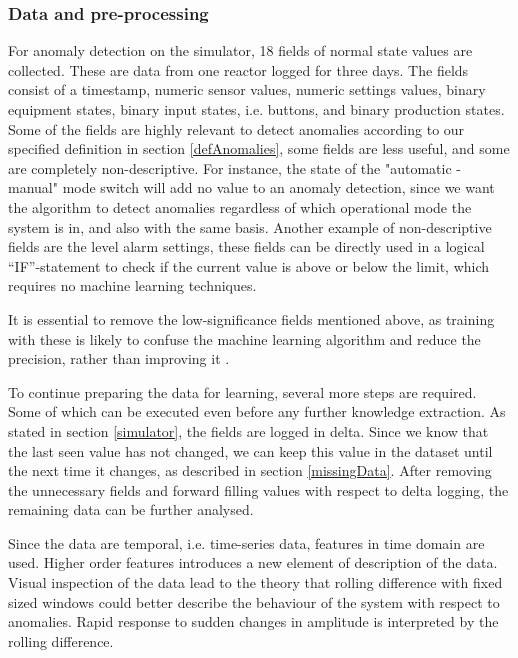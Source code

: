 \documentclass[english, a4paper]{report}
\begin{document}
{{{            \subsubsection{Data and pre-processing} \label{simuAnomDPP}
            {                
                For anomaly detection on the simulator, 18 fields of normal state values are collected. These are data from one reactor logged for three days. The fields consist of a timestamp, numeric sensor values, numeric settings values, binary equipment states, binary input states, i.e. buttons, and binary production states. Some of the fields are highly relevant to detect anomalies according to our specified definition in section \ref{defAnomalies}, some fields are less useful, and some are completely non-descriptive. For instance, the state of the "automatic - manual" mode switch will add no value to an anomaly detection, since we want the algorithm to detect anomalies regardless of which operational mode the system is in, and also with the same basis. Another example of non-descriptive fields are the level alarm settings, these fields can be directly used in a logical “IF”-statement to check if the current value is above or below the limit, which requires no machine learning techniques.
                \par
                It is essential to remove the low-significance fields mentioned above, as training with these is likely to confuse the machine learning algorithm and reduce the precision, rather than improving it \cite{appliedPredictiveModeling}.
                \par
                To continue preparing the data for learning, several more steps are required. Some of which can be executed even before any further knowledge extraction. As stated in section \ref{simulator}, the fields are logged in delta. Since we know that the last seen value has not changed, we can keep this value in the dataset until the next time it changes, as described in section \ref{missingData}. After removing the unnecessary fields and forward filling values with respect to delta logging, the remaining data can be further analysed. 
                \par
                Since the data are temporal, i.e. time-series data, features in time domain are used. Higher order features introduces a new element of description of the data. Visual inspection of the data lead to the theory that rolling difference with fixed sized windows could better describe the behaviour of the system with respect to anomalies. Rapid response to sudden changes in amplitude is interpreted by the rolling difference.
            }
            
}}}
\end{document}
